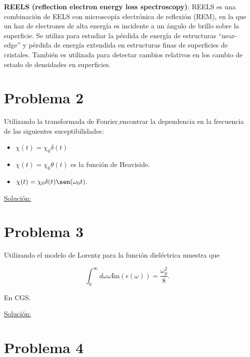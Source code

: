 \documentclass[a4paper,11pt]{article}
\numberwithin{equation}{section}
\begin{document}
\vspace{.3cm}

\textbf{REELS (reflection electron energy loss spectroscopy)}: REELS es una combinación 
de EELS con microscopía electrónica de reflexión (REM), en la que un haz de electrones 
de alta energía es incidente a un ángulo de brillo sobre la superficie. Se utiliza 
para estudiar la pérdida de energía de estructuras ``near-edge'' y pérdida de energía 
extendida en estructuras finas de superficies de cristales. También es 
utilizada para detectar cambios relativos en los cambio de estado de densidades 
en superficies.

\section{Problema 2}

Utilizando la transformada de Fourier,encontrar la dependencia en la frecuencia de las siguientes suceptibilidades:

\begin{itemize}
 \item $\chi(t) = \chi_0 \delta(t)$
 \item $\chi(t) = \chi_0\theta(t)$ es la función de Heaviside.
 \item $\chi(t) = \chi_0\delta(t)\sen(\omega_0 t)$.
\end{itemize}

\vspace{.3cm}

\underline{Solución:} \vspace{.3cm}

\section{Problema 3}

Utilizando el modelo de Lorentz para la función dieléctrica muestra que 

$$
\int_0^\infty d\omega \omega \text{Im}(\epsilon(\omega)) = \frac{\omega_p^2}{8}.
$$

En CGS.

\vspace{.3cm}

\underline{Solución:} \vspace{.3cm}

\section{Problema 4}
\end{document}
